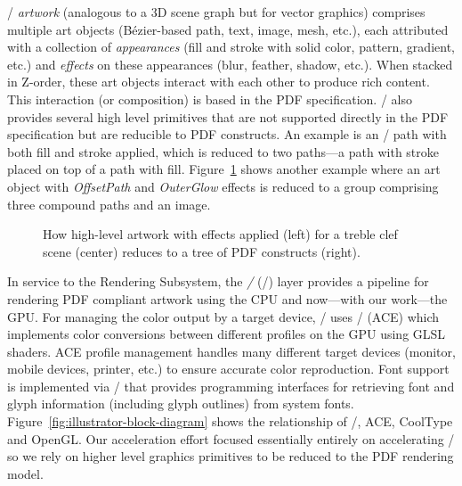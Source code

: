 \AnIllustrator/ {\em artwork} (analogous to a 3D scene graph but for vector graphics) comprises
multiple art objects (B\'{e}zier-based path, text, image, mesh, etc.), each
attributed with a collection of {\em appearances} (fill and stroke with solid color,
pattern, gradient, etc.) and {\em effects} on these appearances (blur, feather,
shadow, etc.). When stacked in Z-order, these art objects interact with
each other to produce rich content. This interaction (or composition)
is based in the PDF specification. \Illustrator/ also provides several
high level primitives that are not supported directly in the PDF
specification but are reducible to PDF constructs. An example is an
\Illustrator/ path with both fill and stroke applied, which is reduced
to two paths---a path with stroke placed on top of a path with
fill. Figure~\ref{fig:artwork-layer} shows another example where an art
object with {\em OffsetPath} and {\em OuterGlow} effects is reduced to a group
comprising three compound paths and an image.

\begin{figure}[tb]
  \caption{How high-level artwork with effects applied (left) for a treble clef scene (center) reduces to a tree of PDF constructs (right).}
  \label{fig:artwork-layer}
\end{figure}

In service to the Rendering Subsystem, the {\em \AdobeGraphicsModel/} (\AGM/) layer
provides a pipeline for rendering PDF compliant artwork using the CPU
and now---with our work---the GPU.
For managing the color output by a target device, \AGM/ uses
\AdobeColorEngine/ (ACE) which implements color conversions
between different profiles on the GPU using GLSL shaders.
ACE profile management handles many different target devices (monitor, mobile devices, printer, etc.)
to ensure accurate color reproduction.
Font support is
implemented via \CoolType/ that provides programming interfaces for retrieving
font and glyph information (including glyph outlines) from system
fonts.
Figure~\ref{fig:illustrator-block-diagram} shows the relationship of
\AGM/, ACE, CoolType and OpenGL.
Our acceleration effort focused essentially entirely
on accelerating \AGM/ so we rely on higher level graphics primitives to be
reduced to the PDF rendering model.
